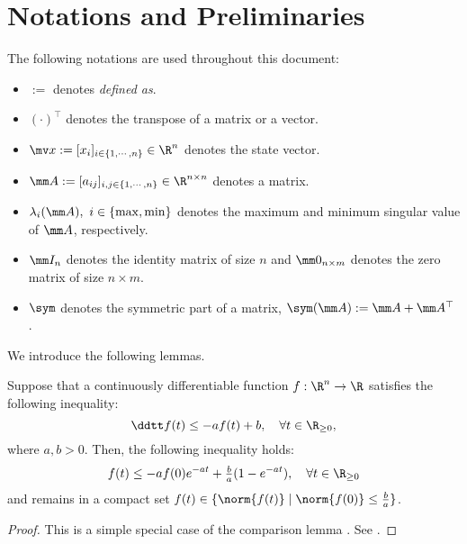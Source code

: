 
\section{Notations and Preliminaries}

The following notations are used throughout this document:
\begin{itemize}
    \item $:=$ denotes \textit{defined as}.
    \item $(\cdot)^\top$ denotes the transpose of a matrix or a vector.
    \item $\bdx:=[x_i]_{i\in\{1,\cdots,n\}}\in\R^n$ denotes the state vector.
    \item $\mm A:=[a_{ij}]_{i,j\in\{1,\cdots,n\}}\in\R^{n\times n}$ denotes a matrix.
    \item $\lambda_{i}(\mm A),\ i\in\{\max,\min\}$ denotes the maximum and minimum singular value of $\mm A$, respectively.
    \item $\mm I_n$ denotes the identity matrix of size $n$ and $\mm 0_{n\times m}$ denotes the zero matrix of size $n\times m$.
    \item $\sym$ denotes the symmetric part of a matrix, \ie $\sym(\mm A):=\mm A+\mm A^\top$ \cite{Tsukamoto:2021ac}.
\end{itemize}

We introduce the following lemmas.

\begin{lem}
	Suppose that a continuously differentiable function $f:\R^n\to\R$ satisfies the following inequality:
	\begin{equation}
		\ddtt f(t)\le -a f(t)+ b, \quad \forall t\in\R_{\ge 0}
		,
	\end{equation}
	where $a,b>0$.
	Then, the following inequality holds:
	\begin{equation}
		f(t)\le -af(0)e^{-at} + \tfrac{b}{a}(1-e^{-at}), \quad \forall t\in\R_{\ge 0}
	\end{equation}
	and remains in a compact set $f(t)\in\{\norm{f(t)} \mid \norm{f(0)}\le \tfrac{b}{a}\}$.
	\label{lem:comparison}
\end{lem}

\begin{proof}
	This is a simple special case of the comparison lemma \cite[pp. 102-103]{Khalil:2002aa}.
	See \cite[pp. 659-660]{Khalil:2002aa}.
\end{proof}